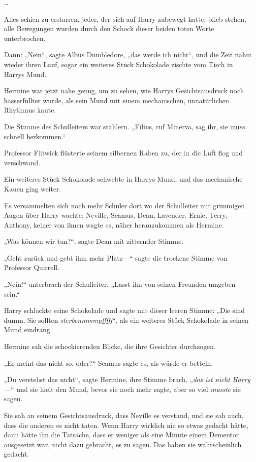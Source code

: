 {…

Alles schien zu erstarren, jeder, der sich auf Harry zubewegt hatte, blieb stehen, alle Bewegungen wurden durch den Schock dieser beiden toten Worte unterbrochen.

Dann: „Nein“, sagte Albus Dumbledore, „das werde ich nicht“, und die Zeit nahm wieder ihren Lauf, sogar ein weiteres Stück Schokolade zischte vom Tisch in Harrys Mund.

Hermine war jetzt nahe genug, um zu sehen, wie Harrys Gesichtsausdruck noch hasserfüllter wurde, als sein Mund mit einem mechanischen, unnatürlichen Rhythmus kaute.

Die Stimme des Schulleiters war stählern. „Filius, ruf Minerva, sag ihr, sie muss schnell herkommen.“

Professor Flitwick flüsterte seinem silbernen Raben zu, der in die Luft flog und verschwand.

Ein weiteres Stück Schokolade schwebte in Harrys Mund, und das mechanische Kauen ging weiter.

Es versammelten sich noch mehr Schüler dort wo der Schulleiter mit grimmigen Augen über Harry wachte: Neville, Seamus, Dean, Lavender, Ernie, Terry, Anthony, keiner von ihnen wagte es, näher heranzukommen als Hermine.

„Was können wir tun?“, sagte Dean mit zitternder Stimme.

„Geht zurück und gebt ihm mehr Platz—“ sagte die trockene Stimme von Professor Quirrell.

„Nein!“ unterbrach der Schulleiter. „Lasst ihn von seinen Freunden umgeben sein.“

Harry schluckte seine Schokolade und sagte mit dieser leeren Stimme: „Die sind dumm. Sie sollten \emph{sterbenmmmpfffff}“, als ein weiteres Stück Schokolade in seinen Mund eindrang.

Hermine sah die schockierenden Blicke, die ihre Gesichter durchzogen.

„Er meint das nicht so, oder?“ Seamus sagte es, als würde er betteln.

„Du verstehst das nicht“, sagte Hermine, ihre Stimme brach, „\emph{das ist nicht Harry}—“ und sie hielt den Mund, bevor sie noch mehr sagte, aber so viel \emph{musste} sie sagen.

Sie sah an seinem Gesichtsausdruck, dass Neville es verstand, und sie sah auch, dass die anderen es nicht taten. Wenn Harry wirklich nie so etwas gedacht hätte, dann hätte ihn die Tatsache, dass er weniger als eine Minute einem Dementor ausgesetzt war, nicht dazu gebracht, es zu sagen. Das haben sie wahrscheinlich gedacht.

}
